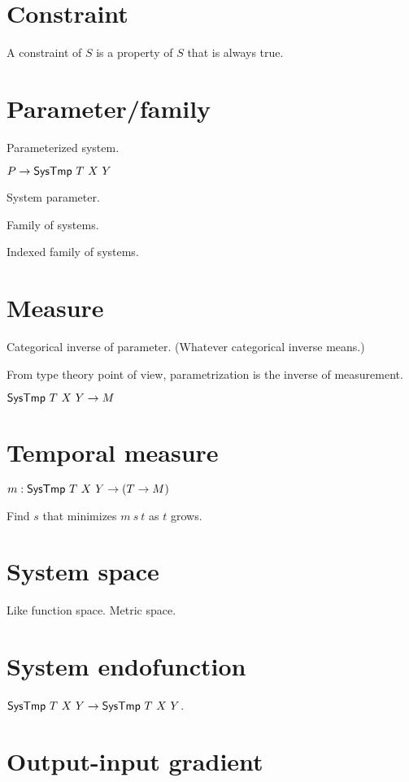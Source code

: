 \section{Constraint}

A constraint of \(S\) is a property of \(S\) that is always true.

\section{Parameter/family}

Parameterized system.

\( P \to \textsf{SysTmp}~T~X~Y \)

System parameter.

Family of systems.

Indexed family of systems.

\section{Measure}

Categorical inverse of parameter. (Whatever categorical inverse means.)

From type theory point of view, parametrization is the inverse of measurement.

\( \textsf{SysTmp}~T~X~Y \to M \)

\section{Temporal measure}

\( m : \textsf{SysTmp}~T~X~Y \to (T \to M) \)

Find \(s\) that minimizes \(m~s~t\) as \(t\) grows.

\section{System space}

Like function space.
Metric space.

\section{System endofunction}

\( \textsf{SysTmp}~T~X~Y \to \textsf{SysTmp}~T~X~Y \).

\section{Output-input gradient}

